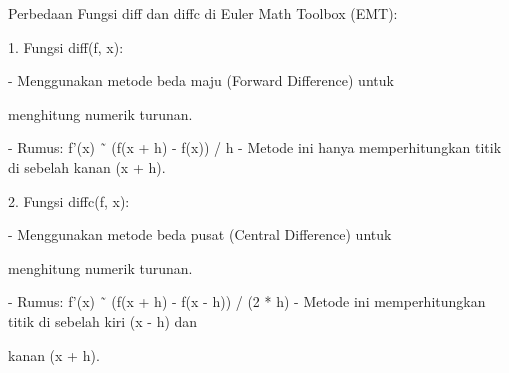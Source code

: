\documentclass{article}
\newenvironment{eulernotebook}{\par}{\par}
\newenvironment{eulercomment}{\par\medskip}{\par\medskip}
\begin{document}
\begin{eulernotebook}
\begin{eulercomment}
\begin{eulercomment}
\begin{eulercomment}
\begin{eulercomment}
\begin{eulercomment}
Perbedaan Fungsi diff dan diffc di Euler Math Toolbox (EMT):

1. Fungsi diff(f, x):\\
\end{eulercomment}
\begin{eulerttcomment}
   - Menggunakan metode beda maju (Forward Difference) untuk
\end{eulerttcomment}
\begin{eulercomment}
menghitung numerik turunan.\\
\end{eulercomment}
\begin{eulerttcomment}
   - Rumus: f'(x) ˜ (f(x + h) - f(x)) / h
   - Metode ini hanya memperhitungkan titik di sebelah kanan (x + h).
\end{eulerttcomment}
\begin{eulercomment}

2. Fungsi diffc(f, x):\\
\end{eulercomment}
\begin{eulerttcomment}
   - Menggunakan metode beda pusat (Central Difference) untuk
\end{eulerttcomment}
\begin{eulercomment}
menghitung numerik turunan.\\
\end{eulercomment}
\begin{eulerttcomment}
   - Rumus: f'(x) ˜ (f(x + h) - f(x - h)) / (2 * h)
   - Metode ini memperhitungkan titik di sebelah kiri (x - h) dan
\end{eulerttcomment}
\begin{eulercomment}
kanan (x + h).


\end{eulercomment}
\end{eulercomment}
\end{eulercomment}
\end{eulercomment}
\end{eulercomment}
\end{eulernotebook}
\end{document}
